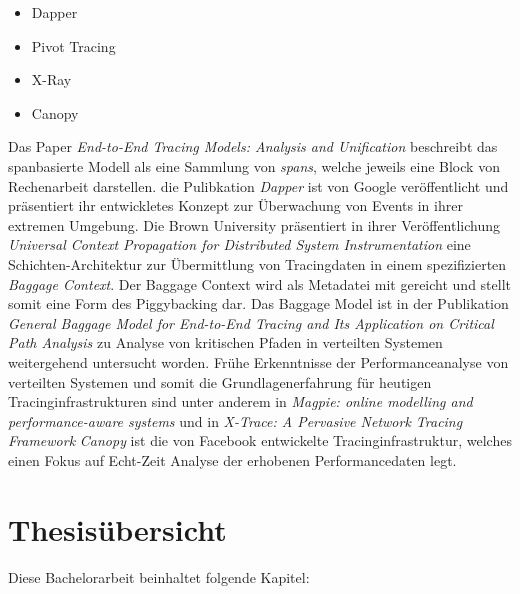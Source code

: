 \begin{itemize}
	\item Dapper 
	\item Pivot Tracing 
	\item X-Ray 
	\item Canopy 
\end{itemize}
Das Paper \emph{End-to-End Tracing Models: Analysis and Unification} beschreibt das spanbasierte Modell als eine Sammlung von \emph{spans}, welche jeweils eine Block von Rechenarbeit darstellen. die Pulibkation \emph{Dapper} ist von Google veröffentlicht und präsentiert ihr entwickletes Konzept zur Überwachung von Events in ihrer extremen Umgebung. Die Brown University präsentiert in ihrer Veröffentlichung \emph{Universal Context Propagation for Distributed System Instrumentation} eine Schichten-Architektur zur Übermittlung von Tracingdaten in einem spezifizierten \emph{Baggage Context}. Der Baggage Context wird als Metadatei mit gereicht und stellt somit eine Form des Piggybacking dar. Das Baggage Model ist in der Publikation \emph{General Baggage Model for End-to-End Tracing and Its Application on Critical Path Analysis} zu Analyse von kritischen Pfaden in verteilten Systemen weitergehend untersucht worden. Frühe Erkenntnisse der Performanceanalyse von verteilten Systemen und somit die Grundlagenerfahrung für heutigen Tracinginfrastrukturen sind unter anderem in  \emph{Magpie: online modelling and performance-aware systems} und in \emph{X-Trace: A Pervasive Network Tracing Framework} \emph{Canopy} ist die von Facebook entwickelte Tracinginfrastruktur, welches einen Fokus auf Echt-Zeit Analyse der erhobenen Performancedaten legt.

\newpage

\section{Thesisübersicht}
\label{section:Thesisübersicht}

Diese Bachelorarbeit beinhaltet folgende Kapitel:

